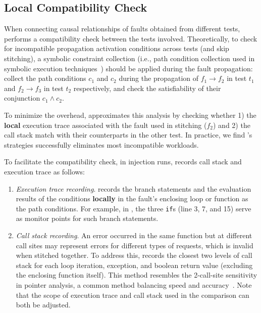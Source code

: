 \subsection{Local Compatibility Check}
\label{sec:chain-forming:approx-check}



\noindent
When connecting causal relationships of faults obtained from different tests, \tool performs a compatibility check 
between the tests involved. 
Theoretically, 
to check for 
incompatible propagation activation conditions across tests (and skip stitching), 
a symbolic constraint collection 
(i.e., path condition collection used in symbolic execution techniques~\cite{cadar2008klee,chipounov2012s2e})
should be applied during the fault propagation: 
collect the path conditions $c_1$ and $c_2$
during the propagation of  $f_1 \rightarrow f_2$ in test $t_1$
and $f_2 \rightarrow f_3$ in test $t_2$ respectively, 
and check the satisfiability of their conjunction 
$c_1 \wedge c_2$.

To minimize the overhead, 
\tool approximates this analysis 
by checking whether 1) the \textbf{local} execution trace associated with the fault 
used in stitching ($f_2$) and 2) the call stack 
match with their counterparts in the other test.
In practice, 
we find \tool's strategies successfully eliminates 
most incompatible workloads. 

To facilitate the compatibility check, 
in 
injection runs, 
\tool records call stack and execution trace as follows: 
\begin{enumerate}[wide, labelwidth=!, labelindent=\parindent, noitemsep, topsep=0pt]

\item
\textit{Execution trace recording}. 
\tool records the branch statements and the evaluation results of the conditions 
\textbf{locally} in the fault's enclosing loop or function 
as the path conditions. 
For example, in , the three \texttt{if}s (line 3, 7, and 15) serve as monitor points for such branch statements. 

\item
\textit{Call stack recording}. 
An error occurred in the same function but at different call sites 
may represent errors for different types of requests, 
which is invalid when stitched together. 
To address this, \tool records the closest two levels of call stack for each loop iteration, exception, and boolean return value (excluding the enclosing function itself). 
This method resembles the  2-call-site sensitivity in pointer analysis, a common method balancing speed and accuracy~\cite{jeon2022return,li2020principled, tan2017efficient}. 
Note that 
the scope of 
execution trace 
and call stack 
used in the comparison 
can both be adjusted. 

\end{enumerate}


